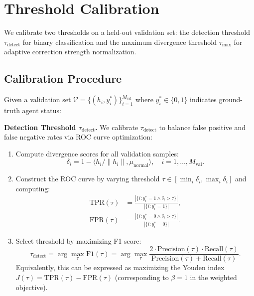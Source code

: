 \documentclass{article}
\theoremstyle{plain}
\theoremstyle{definition}
\theoremstyle{remark}
\begin{document}
\section{Threshold Calibration}
\label{App:Threshold}

We calibrate two thresholds on a held-out validation set: the detection 
threshold $\tau_{\text{detect}}$ for binary classification and the maximum 
divergence threshold $\tau_{\text{max}}$ for adaptive correction strength 
normalization.

\subsection{Calibration Procedure}

Given a validation set $\mathcal{V} = \{(h_i, y_i^*)\}_{i=1}^{M_{\text{val}}}$ 
where $y_i^* \in \{0, 1\}$ indicates ground-truth agent status:

\textbf{Detection Threshold $\tau_{\text{detect}}$.} We calibrate $\tau_{\text{detect}}$ to balance false positive and false 
negative rates via ROC curve optimization:

\begin{enumerate}
\item Compute divergence scores for all validation samples:
\begin{equation}
\delta_i = 1 - \langle h_i / \|h_i\|, \mu_{\text{normal}} \rangle, 
\quad i = 1, \ldots, M_{\text{val}}.
\end{equation}

\item Construct the ROC curve by varying threshold 
$\tau \in [\min_i \delta_i, \max_i \delta_i]$ and computing:
\begin{align}
\text{TPR}(\tau) &= \frac{|\{i : y_i^* = 1 \land \delta_i > \tau\}|}{|\{i : y_i^* = 1\}|}, \\
\text{FPR}(\tau) &= \frac{|\{i : y_i^* = 0 \land \delta_i > \tau\}|}{|\{i : y_i^* = 0\}|}.
\end{align}

\item Select threshold by maximizing F1 score:
\begin{equation}
\tau_{\text{detect}} = \arg\max_{\tau} \text{F1}(\tau) 
= \arg\max_{\tau} \frac{2 \cdot \text{Precision}(\tau) \cdot \text{Recall}(\tau)}{\text{Precision}(\tau) + \text{Recall}(\tau)}.
\end{equation}
Equivalently, this can be expressed as maximizing the Youden index 
$J(\tau) = \text{TPR}(\tau) - \text{FPR}(\tau)$ (corresponding to 
$\beta = 1$ in the weighted objective).
\end{enumerate}
\end{document}
